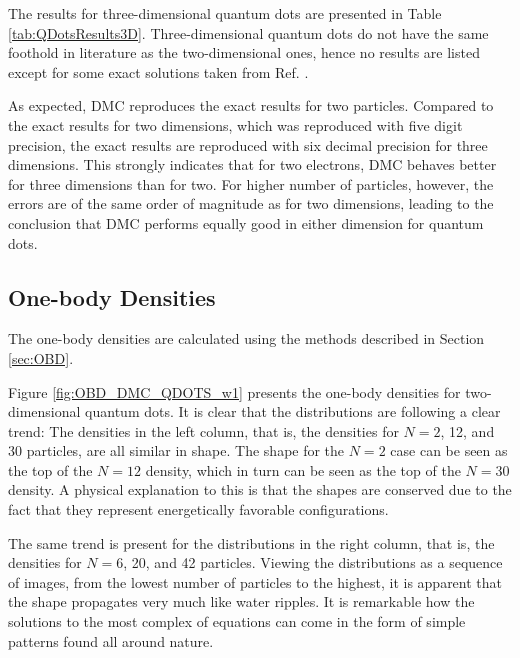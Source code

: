 The results for three-dimensional quantum dots are presented in Table \ref{tab:QDotsResults3D}. Three-dimensional quantum dots do not have the same foothold in literature as the two-dimensional ones, hence no results are listed except for some exact solutions taken from Ref. \cite{taut}. 

As expected, DMC reproduces the exact results for two particles. Compared to the exact results for two dimensions, which was reproduced with five digit precision, the exact results are reproduced with six decimal precision for three dimensions. This strongly indicates that for two electrons, DMC behaves better for three dimensions than for two. For higher number of particles, however, the errors are of the same order of magnitude as for two dimensions, leading to the conclusion that DMC performs equally good in either dimension for quantum dots. 

\subsection{One-body Densities}

The one-body densities are calculated using the methods described in Section \ref{sec:OBD}.

Figure \ref{fig:OBD_DMC_QDOTS_w1} presents the one-body densities for two-dimensional quantum dots. It is clear that the distributions are following a clear trend: The densities in the left column, that is, the densities for $N=2$, 12, and 30 particles, are all similar in shape. The shape for the $N=2$ case can be seen as the top of the $N=12$ density, which in turn can be seen as the top of the $N=30$ density. A physical explanation to this is that the shapes are conserved due to the fact that they represent energetically favorable configurations. 

The same trend is present for the distributions in the right column, that is, the densities for $N=6$, 20, and 42 particles. Viewing the distributions as a sequence of images, from the lowest number of particles to the highest, it is apparent that the shape propagates very much like water ripples. It is remarkable how the solutions to the most complex of equations can come in the form of simple patterns found all around nature.


